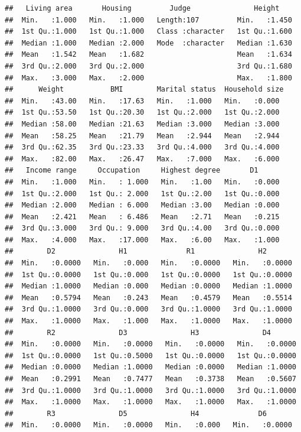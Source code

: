 \documentclass[
]{book}
\begin{document}
\begin{verbatim}
##   Living area       Housing         Judge               Height     
##  Min.   :1.000   Min.   :1.000   Length:107         Min.   :1.450  
##  1st Qu.:1.000   1st Qu.:1.000   Class :character   1st Qu.:1.600  
##  Median :1.000   Median :2.000   Mode  :character   Median :1.630  
##  Mean   :1.542   Mean   :1.682                      Mean   :1.634  
##  3rd Qu.:2.000   3rd Qu.:2.000                      3rd Qu.:1.680  
##  Max.   :3.000   Max.   :2.000                      Max.   :1.800  
##      Weight           BMI        Marital status  Household size 
##  Min.   :43.00   Min.   :17.63   Min.   :1.000   Min.   :0.000  
##  1st Qu.:53.50   1st Qu.:20.30   1st Qu.:2.000   1st Qu.:2.000  
##  Median :58.00   Median :21.63   Median :3.000   Median :3.000  
##  Mean   :58.25   Mean   :21.79   Mean   :2.944   Mean   :2.944  
##  3rd Qu.:62.35   3rd Qu.:23.33   3rd Qu.:4.000   3rd Qu.:4.000  
##  Max.   :82.00   Max.   :26.47   Max.   :7.000   Max.   :6.000  
##   Income range     Occupation     Highest degree       D1       
##  Min.   :1.000   Min.   : 1.000   Min.   :1.00   Min.   :0.000  
##  1st Qu.:2.000   1st Qu.: 2.000   1st Qu.:2.00   1st Qu.:0.000  
##  Median :2.000   Median : 6.000   Median :3.00   Median :0.000  
##  Mean   :2.421   Mean   : 6.486   Mean   :2.71   Mean   :0.215  
##  3rd Qu.:3.000   3rd Qu.: 9.000   3rd Qu.:4.00   3rd Qu.:0.000  
##  Max.   :4.000   Max.   :17.000   Max.   :6.00   Max.   :1.000  
##        D2               H1              R1               H2        
##  Min.   :0.0000   Min.   :0.000   Min.   :0.0000   Min.   :0.0000  
##  1st Qu.:0.0000   1st Qu.:0.000   1st Qu.:0.0000   1st Qu.:0.0000  
##  Median :1.0000   Median :0.000   Median :0.0000   Median :1.0000  
##  Mean   :0.5794   Mean   :0.243   Mean   :0.4579   Mean   :0.5514  
##  3rd Qu.:1.0000   3rd Qu.:0.000   3rd Qu.:1.0000   3rd Qu.:1.0000  
##  Max.   :1.0000   Max.   :1.000   Max.   :1.0000   Max.   :1.0000  
##        R2               D3               H3               D4        
##  Min.   :0.0000   Min.   :0.0000   Min.   :0.0000   Min.   :0.0000  
##  1st Qu.:0.0000   1st Qu.:0.5000   1st Qu.:0.0000   1st Qu.:0.0000  
##  Median :0.0000   Median :1.0000   Median :0.0000   Median :1.0000  
##  Mean   :0.2991   Mean   :0.7477   Mean   :0.3738   Mean   :0.5607  
##  3rd Qu.:1.0000   3rd Qu.:1.0000   3rd Qu.:1.0000   3rd Qu.:1.0000  
##  Max.   :1.0000   Max.   :1.0000   Max.   :1.0000   Max.   :1.0000  
##        R3               D5               H4              D6        
##  Min.   :0.0000   Min.   :0.0000   Min.   :0.000   Min.   :0.0000  

\end{verbatim}
\end{document}
